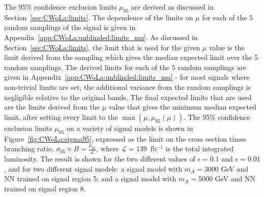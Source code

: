 The 95\% confidence exclusion limits $\mu_{95}$ are derived as discussed in Section~\ref{sec:CWoLa:limits}.
The dependence of the limits on $\mu$ for each of the $5$ random samplings of the signal is given in Appendix~\ref{app:CWoLa:unblinded:limits_mu}.
As discussed in Section~\ref{sec:CWoLa:limits}, the limit that is used for the given $\mu$ value is the limit derived from the sampling which gives the median expected limit over the $5$ random samplings.
The derived limits for each of the $5$ random samplings are given in Appendix~\ref{app:CWoLa:unblinded:limits_mu} - for most signals where non-trivial limits are set, the additional variance from the random samplings is negligible relative to the original bands.
The final expected limits that are used are the limits derived from the $\mu$ value that gives the minimum median expected limit, after setting every limit to the $\max(\mu,\mu_{95}(\mu))$. 
The 95\% confidence exclusion limits $\mu_{95}$ on a variety of signal models is shown in Figure~\ref{fig:CWoLa:sigma95}, expressed as the limit on the cross section times branching ratio, $\sigma_{95}\times B = \frac{\mu_{95}}{\mathcal{L}}$, where $\mathcal{L} = 139$~fb$^{-1}$ is the total integrated luminosity.
The result is shown for the two different values of $\epsilon=0.1$ and $\epsilon=0.01$, and for two different signal models: a signal model with $m_A=3000$ GeV and NN trained on signal region 5; and a signal model with $m_A=5000$ GeV and NN trained on signal region 8.

